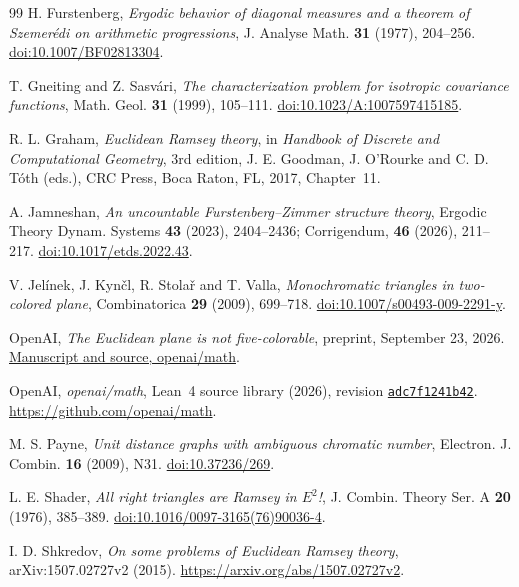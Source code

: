 \documentclass[10pt]{article}
\theoremstyle{remark}
\begin{document}
\begin{thebibliography}{99}
H. Furstenberg, \emph{Ergodic behavior of diagonal measures and a theorem of Szemer\'{e}di on arithmetic progressions}, J. Analyse Math. \textbf{31} (1977), 204--256. \href{https://doi.org/10.1007/BF02813304}{doi:10.1007/BF02813304}.

T. Gneiting and Z. Sasv\'{a}ri, \emph{The characterization problem for isotropic covariance functions}, Math. Geol. \textbf{31} (1999), 105--111. \href{https://doi.org/10.1023/A:1007597415185}{doi:10.1023/A:1007597415185}.

R. L. Graham, \emph{Euclidean Ramsey theory}, in \emph{Handbook of Discrete and Computational Geometry}, 3rd edition, J. E. Goodman, J. O'Rourke and C. D. T\'{o}th (eds.), CRC Press, Boca Raton, FL, 2017, Chapter~11.

A. Jamneshan, \emph{An uncountable Furstenberg--Zimmer structure theory}, Ergodic Theory Dynam. Systems \textbf{43} (2023), 2404--2436; Corrigendum, \textbf{46} (2026), 211--217. \href{https://doi.org/10.1017/etds.2022.43}{doi:10.1017/etds.2022.43}.

V. Jel\'{i}nek, J. Kyn\v{c}l, R. Stola\v{r} and T. Valla, \emph{Monochromatic triangles in two-colored plane}, Combinatorica \textbf{29} (2009), 699--718. \href{https://doi.org/10.1007/s00493-009-2291-y}{doi:10.1007/s00493-009-2291-y}.

OpenAI, \emph{The Euclidean plane is not five-colorable}, preprint, September 23, 2026. \href{https://github.com/openai/math/blob/main/preprints/The-Euclidean-plane-is-not-five-colorable-September-23-2026/paper.pdf}{Manuscript and source, openai/math}.

OpenAI, \emph{openai/math}, Lean~4 source library (2026), revision \href{https://github.com/openai/math/tree/adc7f1241b42e322a6451854ab7e4b4c146bf78a/lean}{\texttt{adc7f1241b42}}. \url{https://github.com/openai/math}.

M. S. Payne, \emph{Unit distance graphs with ambiguous chromatic number}, Electron. J. Combin. \textbf{16} (2009), N31. \href{https://doi.org/10.37236/269}{doi:10.37236/269}.

L. E. Shader, \emph{All right triangles are Ramsey in $E^2$!}, J. Combin. Theory Ser. A \textbf{20} (1976), 385--389. \href{https://doi.org/10.1016/0097-3165(76)90036-4}{doi:10.1016/0097-3165(76)90036-4}.

I. D. Shkredov, \emph{On some problems of Euclidean Ramsey theory}, arXiv:1507.02727v2 (2015). \url{https://arxiv.org/abs/1507.02727v2}.


\end{thebibliography}
\end{document}

